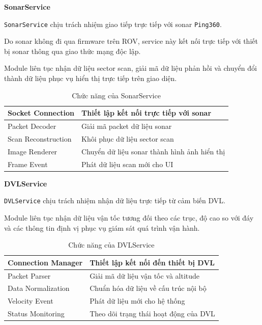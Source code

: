 \documentclass[../DoAn.tex]{subfiles}
\begin{document}
\subsubsubsection\textbf{SonarService}

\texttt{SonarService} chịu trách nhiệm giao tiếp trực tiếp với sonar
\texttt{Ping360}.

Do sonar không đi qua firmware trên ROV, service này kết nối trực tiếp
với thiết bị sonar thông qua giao thức mạng độc lập.

Module liên tục nhận dữ liệu sector scan, giải mã dữ liệu phản hồi và
chuyển đổi thành dữ liệu phục vụ hiển thị trực tiếp trên giao diện.

\begin{table}[H]
\centering
\begin{tabular}{|l|p{9cm}|}
\hline
Socket Connection &
Thiết lập kết nối trực tiếp với sonar\\
\hline
Packet Decoder &
Giải mã packet dữ liệu sonar\\
\hline
Scan Reconstruction &
Khôi phục dữ liệu sector scan\\
\hline
Image Renderer &
Chuyển dữ liệu sonar thành hình ảnh hiển thị\\
\hline
Frame Event &
Phát dữ liệu scan mới cho UI\\
\hline
\end{tabular}
\caption{Chức năng của SonarService}
\end{table}

\subsubsubsection\textbf{DVLService}

\texttt{DVLService} chịu trách nhiệm nhận dữ liệu trực tiếp từ cảm biến
DVL.

Module liên tục nhận dữ liệu vận tốc tương đối theo các trục, độ cao so
với đáy và các thông tin định vị phục vụ giám sát quá trình vận hành.

\begin{table}[H]
\centering
\begin{tabular}{|l|p{9cm}|}
\hline
Connection Manager &
Thiết lập kết nối đến thiết bị DVL\\
\hline
Packet Parser &
Giải mã dữ liệu vận tốc và altitude\\
\hline
Data Normalization &
Chuẩn hóa dữ liệu về cấu trúc nội bộ\\
\hline
Velocity Event &
Phát dữ liệu mới cho hệ thống\\
\hline
Status Monitoring &
Theo dõi trạng thái hoạt động của DVL\\
\hline
\end{tabular}
\caption{Chức năng của DVLService}
\end{table}
\end{document}
